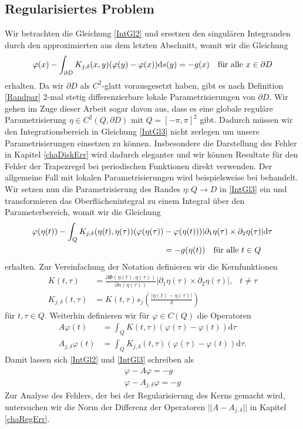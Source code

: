 \documentclass[12pt,a4paper]{scrartcl}
\newcommand{\dd}{\mathrm{d}}
\numberwithin{equation}{section}
\newcommand{\fa}{\text{\quad für alle }}
\begin{document}
\subsection{Regularisiertes Problem} 
Wir betrachten die Gleichung \eqref{IntGl2} und ersetzen den singulären Integranden durch den approximierten aus dem letzten Abschnitt, womit wir die Gleichung
\begin{equation} \label{IntGl3}
\varphi(x) - \int_{\partial D} K_{j,\delta}(x,y)(\varphi(y)-\varphi(x)) \dd s(y) = - g(x) \fa x \in \partial D
\end{equation}
erhalten. Da wir $\partial D$ als $C^2$-glatt vorausgesetzt haben, gibt es nach Definition \ref{Randpar} 2-mal stetig differenzierbare lokale Parametrisierungen von $\partial D$. Wir gehen im Zuge dieser Arbeit sogar davon aus, dass es eine globale reguläre Parametrisierung $\eta \in C^2(Q, \partial D)$ mit $Q = [-\pi, \pi]^2$ gibt.
Dadurch müssen wir den Integrationsbereich in Gleichung \eqref{IntGl3} nicht zerlegen um unsere Parametrisierungen einsetzen zu können. Insbesondere die Darstellung des Fehler in Kapitel \ref{chaDiskErr} wird dadurch eleganter und wir können Resultate für den Fehler der Trapezregel bei periodischen Funktionen direkt verwenden.
Der allgemeine Fall mit lokalen Parametrisierungen wird beispielsweise bei \cite{Collet} behandelt. \\
 
Wir setzen nun die Parametrisierung des Randes $\eta : Q \to D$  in \eqref{IntGl3} ein und transformieren das Oberflächenintegral zu einem Integral über den Parameterbereich, womit wir die Gleichung 
\begin{align*}
\varphi(\eta(t)) - \int_{Q} K_{j,\delta}(\eta(t),\eta(\tau))(\varphi(\eta(\tau))&-\varphi(\eta(t))) |\partial_1 \eta (\tau) \times \partial_2 \eta(\tau)| \dd \tau \\&= - g(\eta(t)) \fa t \in Q
\end{align*}
erhalten. Zur Vereinfachung der Notation definieren wir die Kernfunktionen
\begin{align*}
K(t,\tau) &= \frac{\partial \Phi(\eta(t),\eta(\tau))}{\partial n (\eta(\tau))}|\partial_1 \eta (\tau) \times \partial_2 \eta(\tau)|, &t \neq \tau \\
K_{j,\delta}(t,\tau)&= K(t,\tau) s_j \left(\frac{|\eta(t)-\eta(\tau)|}{\delta}\right)
\end{align*}
für $t,\tau \in Q$. Weiterhin definieren wir für $\varphi \in C(Q)$ die Operatoren 
\begin{align*}
A \varphi(t) &= \int_Q K(t,\tau) (\varphi(\tau)- \varphi(t)) \dd \tau \\
A_{j,\delta} \varphi(t) &= \int_Q K_{j,\delta}(t,\tau) (\varphi(\tau)- \varphi(t)) \dd \tau.
\end{align*}
Damit lassen sich \eqref{IntGl2} und \eqref{IntGl3} schreiben als 
\begin{align*}
\varphi - A \varphi = -g  \\
\varphi - A_{j,\delta} \varphi = -g
\end{align*}
Zur Analyse des Fehlers, der bei der Regularisierung des Kerns gemacht wird, untersuchen wir die Norm der Differenz der Operatoren $||A- A_{j,\delta}||$ in Kapitel \ref{chaRegErr}. 
\end{document}
